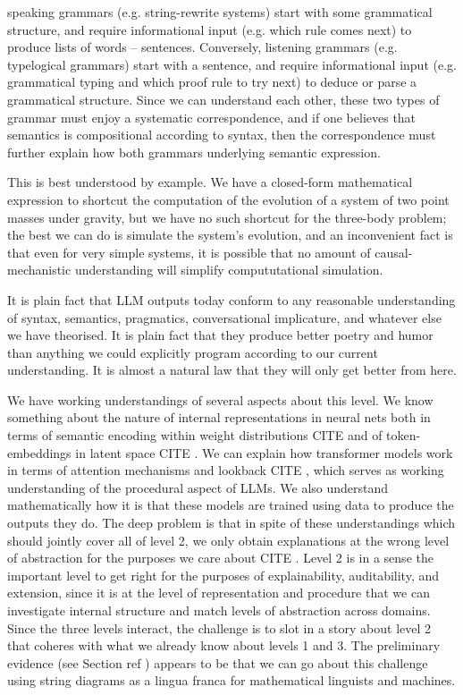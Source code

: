 speaking grammars (e.g. string-rewrite systems) start with some grammatical structure, and require informational input (e.g. which rule comes next) to produce lists of words -- sentences. Conversely, listening grammars (e.g. typelogical grammars) start with a sentence, and require informational input (e.g. grammatical typing and which proof rule to try next) to deduce or parse a grammatical structure. Since we can understand each other, these two types of grammar must enjoy a systematic correspondence, and if one believes that semantics is compositional according to syntax, then the correspondence must further explain how both grammars underlying semantic expression. 



This is best understood by example. We have a closed-form mathematical expression to shortcut the computation of the evolution of a system of two point masses under gravity, but we have no such shortcut for the three-body problem; the best we can do is simulate the system's evolution, and an inconvenient fact is that even for very simple systems, it is possible that no amount of causal-mechanistic understanding will simplify compututational simulation.


It is plain fact that LLM outputs today conform to any reasonable understanding of syntax, semantics, pragmatics, conversational implicature, and whatever else we have theorised. It is plain fact that they produce better poetry and humor than anything we could explicitly program according to our current understanding. It is almost a natural law that they will only get better from here.

We have working understandings of several aspects about this level. We know something about the nature of internal representations in neural nets both in terms of semantic encoding within weight distributions \bR CITE \e and of token-embeddings in latent space \bR CITE \e. We can explain how transformer models work in terms of attention mechanisms and lookback \bR CITE \e, which serves as working understanding of the procedural aspect of LLMs. We also understand mathematically how it is that these models are trained using data to produce the outputs they do. The deep problem is that in spite of these understandings which should jointly cover all of level 2, we only obtain explanations at the wrong level of abstraction for the purposes we care about \bR CITE \e. Level 2 is in a sense the important level to get right for the purposes of explainability, auditability, and extension, since it is at the level of representation and procedure that we can investigate internal structure and match levels of abstraction across domains. Since the three levels interact, the challenge is to slot in a story about level 2 that coheres with what we already know about levels 1 and 3. The preliminary evidence (see Section \bR ref \e) appears to be that we can go about this challenge using string diagrams as a lingua franca for mathematical linguists and machines.

